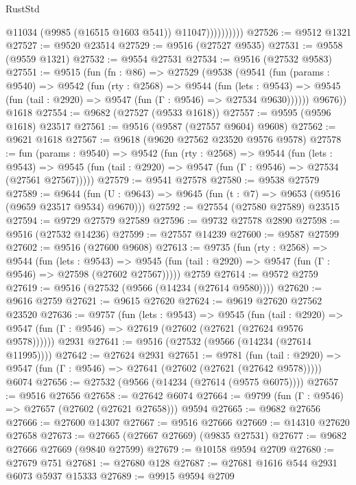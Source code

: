 \begin{lexlean}{RustStd}
\begin{coremodule}
                        @11034
                        (@9985 (@16515 @1603 @541))
                        @11047))))))))))
@27526 := @9512 @1321
@27527 := @9520 @23514
@27529 := @9516 (@27527 @9535)
@27531 := @9558 (@9559 @1321)
@27532 := @9554 @27531
@27534 := @9516 (@27532 @9583)
@27551 := @9515
    (fun (fn : @86) =>
    @27529
      (@9538
        (@9541
          (fun (params : @9540) =>
          @9542
            (fun (rty : @2568) =>
            @9544
              (fun (lets : @9543) =>
              @9545 (fun (tail : @2920) => @9547 (fun (Γ : @9546) => @27534 @9630))))))
        @9676))
    @1618
@27554 := @9682 (@27527 (@9533 @1618))
@27557 := @9595 (@9596 @1618) @23517
@27561 := @9516 (@9587 (@27557 @9604) @9608)
@27562 := @9621 @1618
@27567 := @9618 (@9620 @27562 @23520 @9576 @9578)
@27578 := fun (params : @9540) =>
  @9542
    (fun (rty : @2568) =>
    @9544
      (fun (lets : @9543) =>
      @9545 (fun (tail : @2920) => @9547 (fun (Γ : @9546) => @27534 (@27561 @27567)))))
@27579 := @9541 @27578
@27580 := @9538 @27579
@27589 := @9644
    (fun (U : @9643) => @9645 (fun (t : @7) => @9653 (@9516 (@9659 @23517 @9534) @9670)))
@27592 := @27554 (@27580 @27589) @23515
@27594 := @9729 @27579 @27589
@27596 := @9732 @27578 @2890
@27598 := @9516 (@27532 @14236)
@27599 := @27557 @14239
@27600 := @9587 @27599
@27602 := @9516 (@27600 @9608)
@27613 := @9735
    (fun (rty : @2568) =>
    @9544
      (fun (lets : @9543) =>
      @9545 (fun (tail : @2920) => @9547 (fun (Γ : @9546) => @27598 (@27602 @27567)))))
    @2759
@27614 := @9572 @2759
@27619 := @9516 (@27532 (@9566 (@14234 (@27614 @9580))))
@27620 := @9616 @2759
@27621 := @9615 @27620
@27624 := @9619 @27620 @27562 @23520
@27636 := @9757
    (fun (lets : @9543) =>
    @9545
      (fun (tail : @2920) =>
      @9547 (fun (Γ : @9546) => @27619 (@27602 (@27621 (@27624 @9576 @9578))))))
    @2931
@27641 := @9516 (@27532 (@9566 (@14234 (@27614 @11995))))
@27642 := @27624 @2931
@27651 := @9781
    (fun (tail : @2920) => @9547 (fun (Γ : @9546) => @27641 (@27602 (@27621 (@27642 @9578)))))
    @6074
@27656 := @27532 (@9566 (@14234 (@27614 (@9575 @6075))))
@27657 := @9516 @27656
@27658 := @27642 @6074
@27664 := @9799 (fun (Γ : @9546) => @27657 (@27602 (@27621 @27658))) @9594
@27665 := @9682 @27656
@27666 := @27600 @14307
@27667 := @9516 @27666
@27669 := @14310 @27620 @27658
@27673 := @27665 (@27667 @27669) (@9835 @27531)
@27677 := @9682 @27666 @27669 (@9840 @27599)
@27679 := @10158 @9594 @2709
@27680 := @27679 @751
@27681 := @27680 @128
@27687 := @27681 @1616 @544 @2931 @6073 @5937 @15333
@27689 := @9915 @9594 @2709

\end{coremodule}
\end{lexlean}

